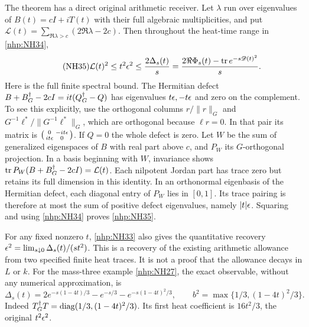 \documentclass[11pt]{article}
\begin{document}
The theorem has a direct original arithmetic receiver.
Let \(\lambda\) run over eigenvalues of \(B(t)=cI+iT(t)\)
with their full algebraic multiplicities, and put
\(\mathcal L(t)=\sum_{\Re\lambda>c}(2\Re\lambda-2c)\).
Then throughout the heat-time range in \eqref{nhp:NH34},
\begin{equation}\tag{NH35}\label{nhp:NH35}
\mathcal L(t)^2\le t^2\epsilon^2
\le\frac{2\Delta_s(t)}s
=\frac{2\Re\Phi_s(t)-\operatorname{tr} e^{-s\mathscr D(t)^2}}s .
\end{equation}
Here is the full finite spectral bound.
The Hermitian defect
\(B+B^\dagger_G-2cI=it(Q^\dagger_G-Q)\) has eigenvalues
\(t\epsilon,-t\epsilon\) and zero on the complement.
To see this explicitly, use the orthogonal columns
\(r/\|r\|_G\) and
\(G^{-1}\ell^*/\|G^{-1}\ell^*\|_G\), which are orthogonal
because \(\ell r=0\).
In that pair its matrix is
\(\left(\begin{smallmatrix}0&-it\epsilon\\it\epsilon&0\end{smallmatrix}\right)\).
If \(Q=0\) the whole defect is zero.
Let \(W\) be the sum of generalized eigenspaces of \(B\)
with real part above \(c\), and \(P_W\) its
\(G\)-orthogonal projection.
In a basis beginning with \(W\), invariance shows
\(\operatorname{tr} P_W(B+B^\dagger_G-2cI)=\mathcal L(t)\).
Each nilpotent Jordan part has trace zero but retains
its full dimension in this identity.
In an orthonormal eigenbasis of the Hermitian defect,
each diagonal entry of \(P_W\) lies in \([0,1]\).
Its trace pairing is therefore at most the sum of
positive defect eigenvalues, namely \(|t|\epsilon\).
Squaring and using \eqref{nhp:NH34} proves \eqref{nhp:NH35}.

For any fixed nonzero \(t\), \eqref{nhp:NH33} also gives
the quantitative recovery
\(\epsilon^2=\lim_{s\downarrow0}\Delta_s(t)/(st^2)\).
This is a recovery of the existing arithmetic allowance
from two specified finite heat traces. It is not a
proof that the allowance decays in \(L\) or \(k\).
For the mass-three example \eqref{nhp:NH27}, the exact
observable, without any numerical approximation, is
\begin{equation}\tag{NH36}\label{nhp:NH36}
\Delta_s(t)=
2e^{-s(1-4t)/3}-e^{-s/3}
-e^{-s(1-4t)^2/3},\qquad
b^2=\max\{1/3,(1-4t)^2/3\}.
\end{equation}
Indeed \(T^\dagger_G T=\operatorname{diag}(1/3,(1-4t)^2/3)\).
Its first heat coefficient is \(16t^2/3\), the
original \(t^2\epsilon^2\).
\end{document}
